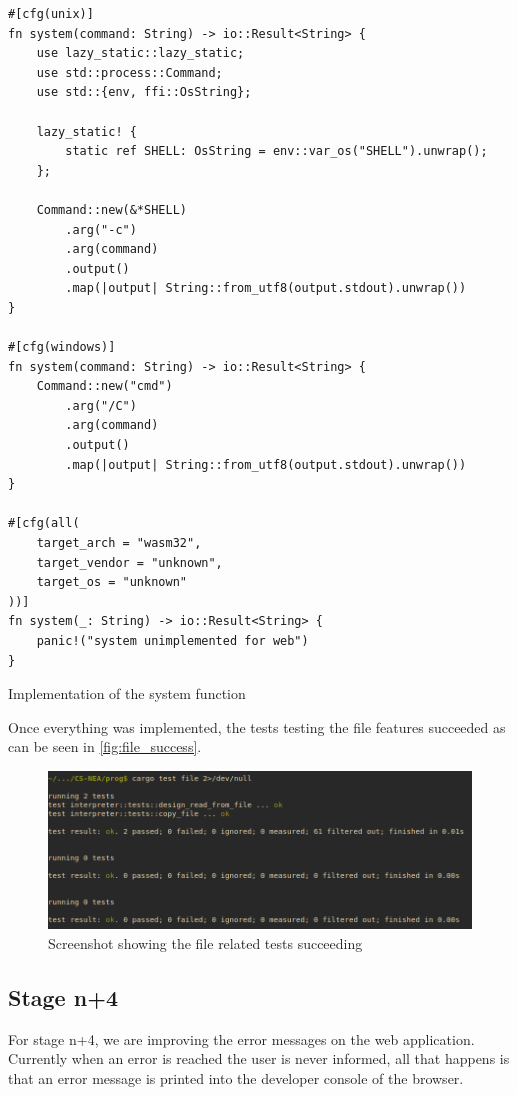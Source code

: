 \documentclass{article}
\begin{document}
\begin{listing}
	\begin{verbatim}
#[cfg(unix)]
fn system(command: String) -> io::Result<String> {
    use lazy_static::lazy_static;
    use std::process::Command;
    use std::{env, ffi::OsString};

    lazy_static! {
        static ref SHELL: OsString = env::var_os("SHELL").unwrap();
    };

    Command::new(&*SHELL)
        .arg("-c")
        .arg(command)
        .output()
        .map(|output| String::from_utf8(output.stdout).unwrap())
}

#[cfg(windows)]
fn system(command: String) -> io::Result<String> {
    Command::new("cmd")
        .arg("/C")
        .arg(command)
        .output()
        .map(|output| String::from_utf8(output.stdout).unwrap())
}

#[cfg(all(
    target_arch = "wasm32",
    target_vendor = "unknown",
    target_os = "unknown"
))]
fn system(_: String) -> io::Result<String> {
    panic!("system unimplemented for web")
}
	\end{verbatim}
	\caption{Implementation of the system function}
	\label{lst:system}
\end{listing}

Once everything was implemented, the tests testing the file features succeeded
as can be seen in \autoref{fig:file_success}.

\begin{figure}
	\includegraphics[width=\textwidth]{file_success}
	\caption{Screenshot showing the file related tests succeeding}
	\label{fig:file_success}
\end{figure}

\subsection{Stage n+4}

For stage n+4, we are improving the error messages on the web application.
Currently when an error is reached the user is never informed, all that happens
is that an error message is printed into the developer console of the browser.
\end{document}
